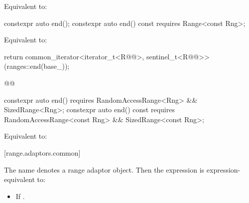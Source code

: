 {\begin{itemdescr}
\pnum
\effects Equivalent to: 
\end{itemdescr}

%
\begin{itemdecl}
constexpr auto end();
constexpr auto end() const requires Range<const Rng>;
\end{itemdecl}

\begin{itemdescr}
\pnum
{}

\pnum
\effects Equivalent to:
\begin{codeblock}
return common_iterator<iterator_t<R@@>, sentinel_t<R@@>>(ranges::end(base_));
\end{codeblock}
\begin{codeblock}
@@
\end{codeblock}
\end{itemdescr}

%
\begin{itemdecl}
constexpr auto end()
  requires RandomAccessRange<Rng> && SizedRange<Rng>;
constexpr auto end() const
  requires RandomAccessRange<const Rng> && SizedRange<const Rng>;
\end{itemdecl}

\begin{itemdescr}
\pnum
\effects Equivalent to: 
\end{itemdescr}

[range.adaptors.common]{}

\pnum
The name  denotes a range adaptor
object.  Then the expression
 is expression-equivalent to:

\begin{itemize}
\item If   
.


\end{itemize}}
